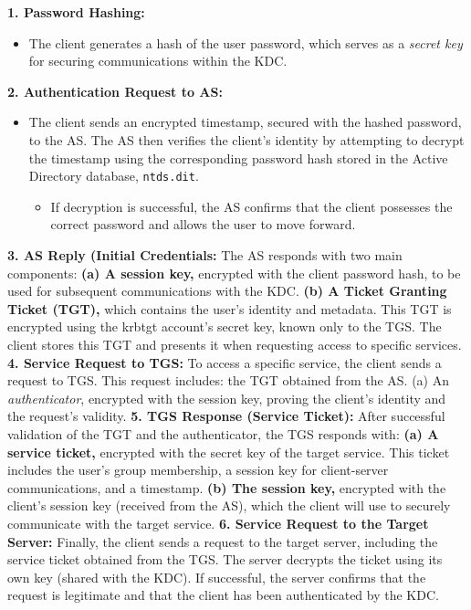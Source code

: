 {\textbf{1. Password Hashing:}
\begin{itemize}
    \item The client generates a hash of the user password, which serves as a \textit{secret key} for securing communications within the KDC.
\end{itemize}
\textbf{2. Authentication Request to AS:}
\begin{itemize}
    \item The client sends an encrypted timestamp, secured with the hashed password, to the AS. The AS then verifies the client's identity by attempting to decrypt the timestamp using the corresponding password hash stored in the Active Directory database, \texttt{ntds.dit}.
    \begin{itemize}
        \item If decryption is successful, the AS confirms that the client possesses the correct password and allows the user to move forward.
\end{itemize}
    \end{itemize}
\textbf{3. AS Reply (Initial Credentials:}
    The AS responds with two main components: \textbf{(a) A session key,} encrypted with the client password hash, to be used for subsequent communications with the KDC.
            \textbf{(b) A Ticket Granting Ticket (TGT),} which contains the user's identity and metadata. This TGT is encrypted using the krbtgt account's secret key, known only to the TGS. The client stores this TGT and presents it when requesting access to specific services.
\textbf{4. Service Request to TGS:}
To access a specific service, the client sends a request to TGS. This request includes:
the TGT obtained from the AS.
            (a) An \textit{authenticator}, encrypted with the session key, proving the client's identity and the request's validity.
\textbf{5. TGS Response (Service Ticket):}
After successful validation of the TGT and the authenticator, the TGS responds with: \textbf{(a) A service ticket,} encrypted with the secret key of the target service. This ticket includes the user's group membership, a session key for client-server communications, and a timestamp.
            \textbf{(b) The session key,} encrypted with the client's session key (received from the AS), which the client will use to securely communicate with the target service.
\textbf{6. Service Request to the Target Server:}
    Finally, the client sends a request to the target server, including the service ticket obtained from the TGS.
            The server decrypts the ticket using its own key (shared with the KDC).
            If successful, the server confirms that the request is legitimate and that the client has been authenticated by the KDC.

}
